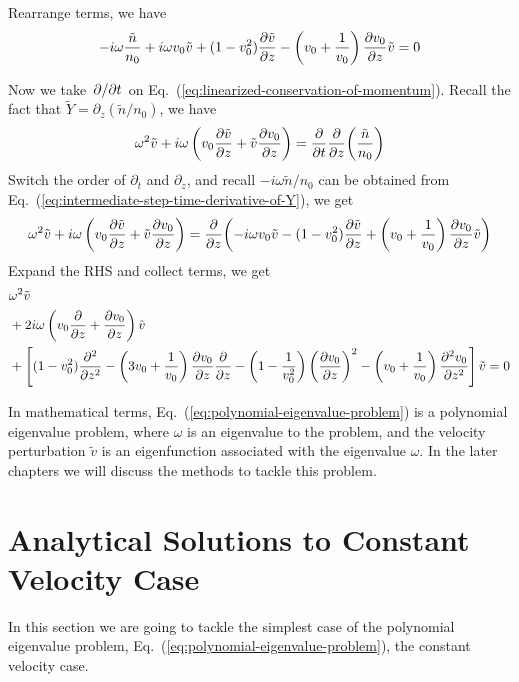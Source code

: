 Rearrange terms, we have
\begin{equation}
	-i\omega\frac{\tilde{n}}{n_0}
	+ i\omega v_0\tilde{v}
	+ (1-v_0^2)\pdv{\tilde{v}}{z}
	- \left(v_0+\frac{1}{v_0}\right)\pdv{v_0}{z}\tilde{v} = 0
	\label{eq:intermediate-step-time-derivative-of-Y}
\end{equation}

Now we take $\pdv*{t}$ on Eq.~(\ref{eq:linearized-conservation-of-momentum}). Recall the fact that $\tilde{Y} = \partial_z(\tilde{n}/n_0)$, we have
\[
	\omega^2\tilde{v} + i\omega\left(v_0\pdv{\tilde{v}}{z} + \tilde{v}\pdv{v_0}{z}\right)
	= \pdv{t}\pdv{z}(\frac{\tilde{n}}{n_0})
\]
Switch the order of $\partial_t$ and $\partial_z$, and recall $-i\omega \tilde{n}/n_0$ can be obtained from Eq.~(\ref{eq:intermediate-step-time-derivative-of-Y}), we get
\[
	\omega^2\tilde{v} + i\omega\left(v_0\pdv{\tilde{v}}{z} + \tilde{v}\pdv{v_0}{z}\right)
	= \pdv{z}(-i\omega v_0\tilde{v}
	- (1-v_0^2)\pdv{\tilde{v}}{z}
	+ \left(v_0+\frac{1}{v_0}\right)\pdv{v_0}{z}\tilde{v})
\]
Expand the RHS and collect terms, we get
\begin{equation} \label{eq:polynomial-eigenvalue-problem}
	\begin{aligned}
		 & \omega^2 \tilde{v}                                          \\
		 & +2i\omega\left(v_0\pdv{}{z} + \pdv{v_0}{z}\right) \tilde{v} \\
		 & +\left[ (1-v_0^2)\pdv[2]{}{z}
			-\left(3v_0 + \frac{1}{v_0}\right)\pdv{v_0}{z}\pdv{}{z}
			- \left(1-\frac{1}{v_0^2}\right)\left(\pdv{v_0}{z}\right)^2
			- \left(v_0+\frac{1}{v_0}\right)\pdv[2]{v_0}{z} \right]\tilde{v}
		= 0
	\end{aligned}
\end{equation}

In mathematical terms, Eq.~(\ref{eq:polynomial-eigenvalue-problem}) is a polynomial eigenvalue problem, where $\omega$ is an eigenvalue to the problem, and the velocity perturbation $\tilde{v}$ is an eigenfunction associated with the eigenvalue $\omega$. In the later chapters we will discuss the methods to tackle this problem.

\section{Analytical Solutions to Constant Velocity Case}
In this section we are going to tackle the simplest case of the polynomial eigenvalue problem, Eq.~(\ref{eq:polynomial-eigenvalue-problem}), the constant velocity case.

